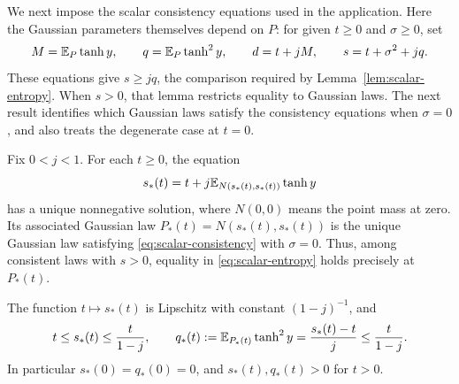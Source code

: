 We next impose the scalar consistency equations used in the
application.  Here the Gaussian parameters themselves depend on
$P$: for given $t\ge0$ and $\sigma\ge0$, set
\begin{equation}
 M=\mathbb E_P\tanh y,\qquad q=\mathbb E_P\tanh^2 y,\qquad
 d=t+jM,\qquad s=t+\sigma^2+jq.
 \label{eq:scalar-consistency}
\end{equation}
These equations give $s\ge jq$, the comparison required by
Lemma~\ref{lem:scalar-entropy}.  When $s>0$, that lemma restricts
equality to Gaussian laws.  The next result identifies which
Gaussian laws satisfy the consistency equations when $\sigma=0$,
and also treats the degenerate case at $t=0$.

\begin{lemma}
\label{lem:gaussian-equality}
Fix $0<j<1$.  For each $t\ge0$, the equation
\begin{equation}
 s_*(t)=t+j\mathbb E_{N(s_*(t),s_*(t))}\tanh y
 \label{eq:scalar-fixed-point}
\end{equation}
has a unique nonnegative solution, where $N(0,0)$ means the point mass
at zero.  Its associated Gaussian law
$P_*(t)=N(s_*(t),s_*(t))$ is the unique Gaussian law satisfying
\eqref{eq:scalar-consistency} with $\sigma=0$.  Thus, among consistent
laws with $s>0$, equality in \eqref{eq:scalar-entropy} holds precisely at
$P_*(t)$.

The function $t\mapsto s_*(t)$ is Lipschitz with constant $(1-j)^{-1}$,
and
\begin{equation}
 t\le s_*(t)\le\frac{t}{1-j},\qquad
 q_*(t):=\mathbb E_{P_*(t)}\tanh^2 y
       =\frac{s_*(t)-t}{j}\le\frac{t}{1-j}.
 \label{eq:scalar-fixed-point-bounds}
\end{equation}
In particular $s_*(0)=q_*(0)=0$, and $s_*(t),q_*(t)>0$ for $t>0$.
\end{lemma}

